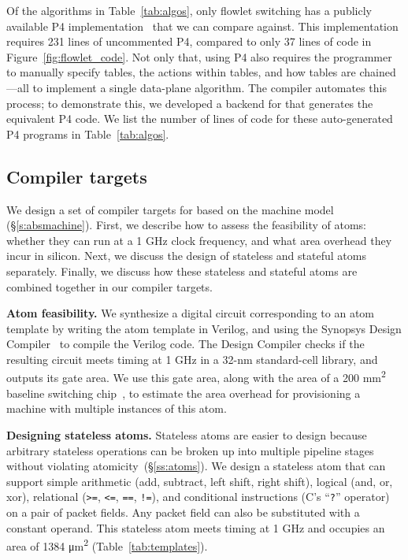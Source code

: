 Of the algorithms in Table~\ref{tab:algos}, only flowlet switching has a
publicly available P4 implementation~\cite{p4_flowlet} that we can compare
against. This implementation requires 231 lines of uncommented P4, compared to
only 37 lines of \pktlanguage code in Figure~\ref{fig:flowlet_code}. Not only
that, using P4 also requires the programmer to manually specify tables, the
actions within tables, and how tables are chained---all to implement a single
data-plane algorithm. The \pktlanguage compiler automates this process; to
demonstrate this, we developed a backend for \pktlanguage that generates the
equivalent P4 code. We list the number of lines of code for these
auto-generated P4 programs in Table~\ref{tab:algos}.
\subsection{Compiler targets}
\label{ss:targets}

We design a set of compiler targets for \pktlanguage based on the
\absmachine machine model (\S\ref{s:absmachine}). First, we describe how to
assess the feasibility of atoms: whether they can run at a 1 GHz clock
frequency, and what area overhead they incur in silicon. Next, we discuss the
design of stateless and stateful atoms separately. Finally, we discuss how
these stateless and stateful atoms are combined together in our compiler
targets.

\medskip
\noindent
\textbf{Atom feasibility.}
We synthesize a digital circuit corresponding to an atom template by
writing the atom template in Verilog, and using the Synopsys Design
Compiler~\cite{synopsys_dc} to compile the Verilog code. The Design Compiler checks
if the resulting circuit meets timing at 1 GHz in a 32-nm
standard-cell library, and outputs its gate area. We use this gate area,
along with the area of a 200 \si{\milli\metre\squared}
baseline switching chip~\cite{gibb_parsing}, to estimate the area overhead for provisioning a
\absmachine machine with multiple instances of this atom.


\medskip
\noindent
\textbf{Designing stateless atoms.}
Stateless atoms are easier to design because arbitrary stateless operations can
be broken up into multiple pipeline stages without violating
atomicity~(\S\ref{ss:atoms}). We design a stateless atom that can support
simple arithmetic (add, subtract, left shift, right shift), logical (and, or,
xor), relational ({\tt >=}, {\tt <=}, {\tt ==}, {\tt !=}), and conditional
instructions (C's ``{\tt ?}'' operator) on a pair of packet fields. Any packet
field can also be substituted with a constant operand. This stateless atom
meets timing at 1 GHz and occupies an area of 1384 \si{\micro\meter\squared}
(Table~\ref{tab:templates}).

